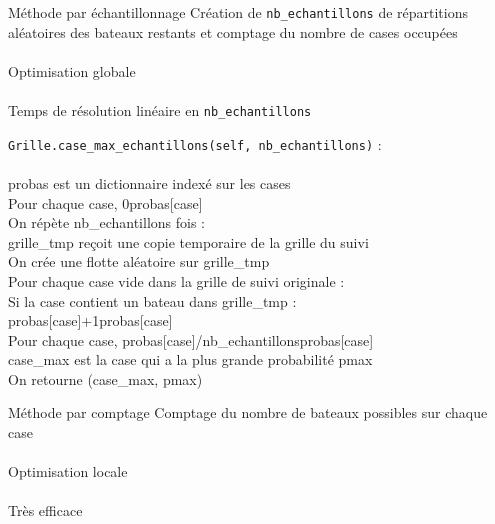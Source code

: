 \begin{frame}{Méthode par échantillonnage}
Création de \texttt{nb\_echantillons} de répartitions aléatoires des bateaux restants et comptage du nombre de cases occupées\\~\\ \pause
Optimisation globale\\~\\ \pause
Temps de résolution linéaire en \texttt{nb\_echantillons}
\end{frame}

{
\begin{frame}[allowframebreaks]
\texttt{Grille.case\_max\_echantillons(self, nb\_echantillons)} :\\~\\
probas est un dictionnaire indexé sur les cases\\
Pour chaque case, 0\sto probas[case]\\
On répète nb\_echantillons fois :\\
grille\_tmp reçoit une copie temporaire de la grille du suivi\\
On crée une flotte aléatoire sur grille\_tmp\\
Pour chaque case vide dans la grille de suivi originale :\\
Si la case contient un bateau dans grille\_tmp :\\
probas[case]+1\sto probas[case]\\
Pour chaque case, probas[case]/nb\_echantillons\sto probas[case]\\
case\_max est la case qui a la plus grande probabilité pmax\\
On retourne (case\_max, pmax)\\
\end{frame}
}

\begin{frame}{Méthode par comptage}
Comptage du nombre de bateaux possibles sur chaque case\\~\\ \pause
Optimisation locale\\~\\ \pause
Très efficace \pause
\end{frame}

